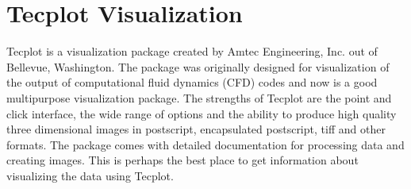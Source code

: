 \section{Tecplot Visualization \label{section:tecplot_visualization}}

Tecplot is a visualization package created by Amtec Engineering, Inc.
out of Bellevue, Washington.  The package was originally designed for
visualization of the output of computational fluid dynamics (CFD)
codes and now is a good multipurpose visualization package.  
The strengths of Tecplot are the point and click interface, the 
wide range of options and the ability to produce high quality
three dimensional images in postscript, encapsulated postscript, tiff
and other formats.  The package comes with detailed
documentation for processing data and creating images.
This is perhaps the best place to get information about visualizing
the data using Tecplot.


